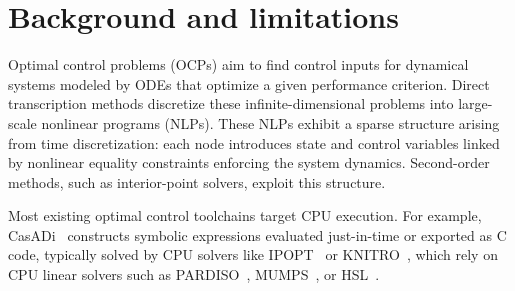 
\section{Background and limitations}

Optimal control problems (OCPs) aim to find control inputs for dynamical systems modeled by ODEs that optimize a given performance criterion.
Direct transcription methods discretize these infinite-dimensional problems into large-scale nonlinear programs (NLPs).
These NLPs exhibit a sparse structure arising from time discretization: each node introduces state and control variables linked by nonlinear equality constraints enforcing the system dynamics.
Second-order methods, such as interior-point solvers, exploit this structure. %

Most existing optimal control toolchains target CPU execution.
For example, CasADi~\cite{Andersson2019} constructs symbolic expressions evaluated just-in-time or exported as C code, typically solved by CPU solvers like IPOPT~\cite{wachter2006implementation} or KNITRO~\cite{byrd2006k}, which rely on CPU linear solvers such as PARDISO~\cite{schenk2004solving}, MUMPS~\cite{amestoy2000mumps}, or HSL~\cite{fowkes2024libhsl}.

